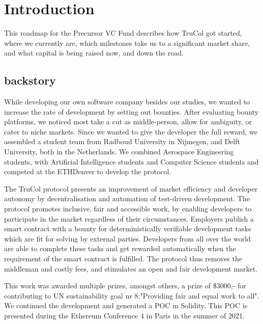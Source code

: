 \section{Introduction}
This roadmap for the Precursor VC Fund describes how TruCol got started, where we currently are, which milestones take us to a significant market share, and what capital is being raised now, and down the road.

\subsection{backstory}
While developing our own software company besides our studies, we wanted to increase the rate of development by setting out bounties. After evaluating bounty platforms, we noticed most take a cut as middle-person, allow for ambiguity, or cater to niche markets. Since we wanted to give the developer the full reward, we assembled a student team from Radboud University in Nijmegen, and Delft University, both in the Netherlands. We combined Aerospace Engineering students, with Artificial Intelligence students and Computer Science students and competed at the ETHDenver to develop the protocol.

The TruCol protocol presents an improvement of market efficiency and developer autonomy by decentralisation and automation of test-driven development. The protocol promotes inclusive, fair and accessible work, by enabling developers to participate in the market regardless of their circumstances. Employers publish a smart contract with a bounty for deterministically verifiable development tasks which are fit for solving by external parties. Developers from all over the world are able to complete these tasks and get rewarded automatically when the requirement of the smart contract is fulfilled. The protocol thus removes the middleman and costly fees, and stimulates an open and fair development market.

This work was awarded multiple prizes, amongst others, a prize of \$3000,- for contributing to UN sustainability goal nr 8:"Providing fair and equal work to all". We continued the development and generated a POC in Solidity. This POC is presented during the Ethereum Conference 4 in Paris in the summer of 2021.
